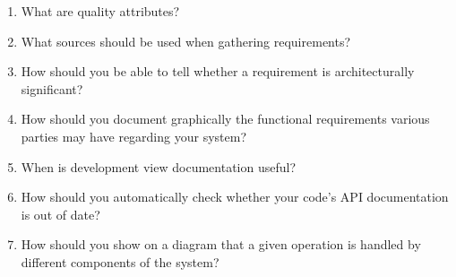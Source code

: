 \begin{enumerate}
\item
What are quality attributes?

\item
What sources should be used when gathering requirements?

\item
How should you be able to tell whether a requirement is architecturally significant?

\item
How should you document graphically the functional requirements various parties may have regarding your system?

\item
When is development view documentation useful?

\item
How should you automatically check whether your code's API documentation is out of date?

\item
How should you show on a diagram that a given operation is handled by different components of the system?

\end{enumerate}
